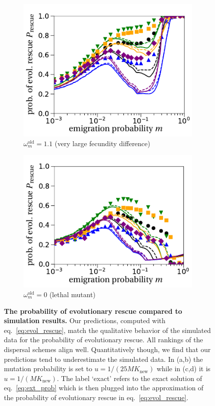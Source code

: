 \documentclass[11pt]{article}
\begin{document}
\begin{figure}[t!]
\begin{subfigure}{.5\textwidth}
  		\centering
  		\includegraphics[width=\linewidth]{fig5c.pdf}
  		\caption{$\omega^\text{old}_m=1.1$ (very large fecundity difference)}
	\end{subfigure}%
	\begin{subfigure}{.5\textwidth}
  		\centering
  		\includegraphics[width=\linewidth]{fig5d.pdf}
  		\caption{$\omega^\text{old}_m=0$ (lethal mutant)}
	\end{subfigure}
	\caption{\textbf{The probability of evolutionary rescue compared to simulation results.} \small Our predictions, computed with eq.~\eqref{eq:evol_rescue}, match the qualitative behavior of the simulated data for the probability of evolutionary rescue. All rankings of the dispersal schemes align well. Quantitatively though, we find that our predictions tend to underestimate the simulated data. In (a,b) the mutation probability is set to $u=1/(25MK_{\text{new}})$ while in (c,d) it is $u=1/(MK_{\text{new}})$. The label `exact' refers to the exact solution of eq.~\eqref{eq:ext_prob} which is then plugged into the approximation of the probability of evolutionary rescue in eq.~\eqref{eq:evol_rescue}.}
	\label{fig:rescue}
\end{figure}
\end{document}
